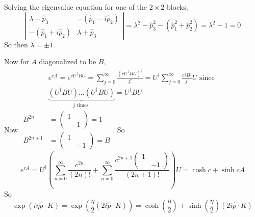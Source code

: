 \documentclass[twoside]{amsart}
\begin{document}
Solving the eigenvalue equation for one of the $2\times 2$ blocks, 
\[
\left| \begin{matrix} \lambda - \widehat{p}_3 & - (\widehat{p}_1 - i \widehat{p}_2 ) \\ -( \widehat{p}_1 + i \widehat{p}_2 ) & \lambda + \widehat{p}_3 \end{matrix} \right| = \lambda^2 - \widehat{p}_3^2 - (\widehat{p}_1^2 + \widehat{p}_2^2) = \lambda^2 - 1 = 0
\]
So then $\lambda = \pm 1$.  

Now for $A$ diagonalized to be $B$, 
\[
\begin{gathered}
  e^{cA} = e^{c U^{\dag} B U} = \sum_{j=0}^{\infty} \frac{ (c U^{\dag} B U )^j }{ j!} = U^{\dag} \sum_{j=0}^{\infty} \frac{ c^j B^j }{j!} U \text{ since } \\
  \underbrace{ (U^{\dag} B U ) \dots (U^{\dag} B U )}_{j \text{ times } } = U^{\dag} B U
\end{gathered}
\]
Now $\begin{aligned} B^{2n} & = \left( \begin{matrix} 1 & \\ & 1 \end{matrix} \right) = 1 \\ B^{2n+1} & = \left( \begin{matrix} 1 & \\ & -1 \end{matrix} \right) = B \end{aligned}$.  So
\[
e^{cA} = U^{\dag} \left( \sum_{n=0}^{\infty} \frac{ c^{2n} }{ (2n)!} + \sum_{n=0}^{\infty} \frac{ c^{2n+1} \left( \begin{matrix} 1 & \\ & -1 \end{matrix} \right) }{ (2n+1)!} \right) U = \cosh{c} + \sinh{c} A
\]
So 
\[
\exp{ (i \eta \widehat{p} \cdot K ) } = \exp{ \left( \frac{ \eta}{2} (2i \widehat{p} \cdot K ) \right) } = \cosh{ \left( \frac{ \eta }{2} \right) } + \sinh{ \left( \frac{ \eta}{2} \right) } (2i \widehat{p}\cdot K )
\]
\end{document}
